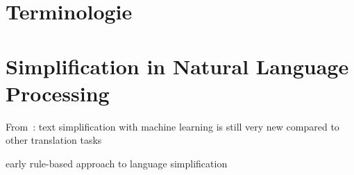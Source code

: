 \section{Terminologie}\label{sec:term}


%
%
%
%





%


%

%


\section{ Simplification in Natural Language Processing}\label{sec:langSimp}


From~\autocite{schomacker2023data}:
text simplification with machine learning is still very new compared to other translation tasks



early rule-based approach to language simplification~\autocite{suter2016}







